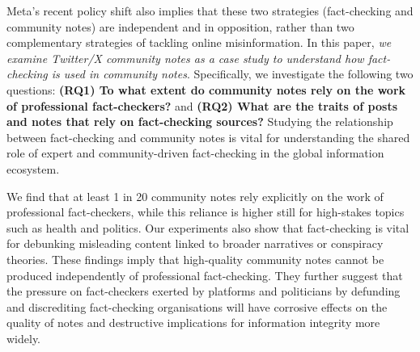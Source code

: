 

Meta's recent policy shift also implies that these two strategies (fact-checking and community notes) are independent and in opposition, rather than two complementary strategies of tackling online misinformation.
In this paper, \textit{we examine Twitter/X community notes as a case study to understand how fact-checking is used in community notes}. Specifically, we investigate the following two questions:  \textbf{(RQ1) To what extent do community notes rely on the work of professional fact-checkers? } and \textbf{(RQ2) What are the traits of posts and notes that rely on fact-checking sources?} 
Studying the relationship between fact-checking and community notes is vital for understanding the shared role of expert and community-driven fact-checking in the global information ecosystem.


We find that at least 1 in 20 community notes rely explicitly on the work of professional fact-checkers, while this reliance is higher still for high-stakes topics such as health and politics. Our experiments also show that fact-checking is vital for debunking misleading content linked to broader narratives or conspiracy theories. These findings imply that high-quality community notes cannot be produced independently of professional fact-checking. They further suggest that the pressure on fact-checkers exerted by platforms and politicians by defunding and discrediting fact-checking organisations will have corrosive effects on the quality of notes and destructive implications for information integrity more widely.
    
    
    
    


